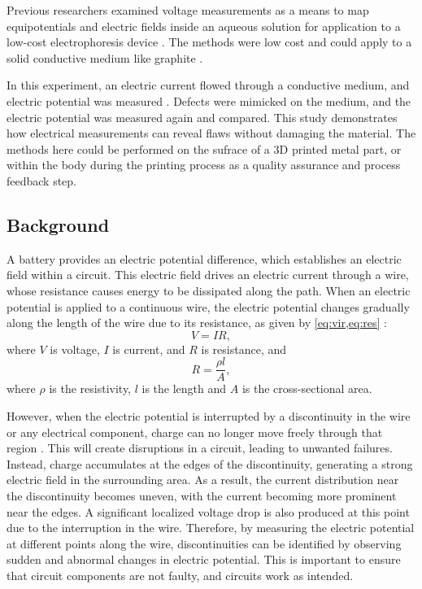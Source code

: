 \documentclass[10pt,journal,twoside]{IEEEtran} %
\begin{document}
Previous researchers examined voltage measurements as a means to map equipotentials and electric fields inside an aqueous solution for application to a low-cost electrophoresis device \cite{ayyagari:2024:computational,baru:2024:demonstrating,cohen:2024:visualizing,edwards:2024:electric,kumar:2024:mapping}. The methods were low cost and could apply to a solid conductive medium like graphite \cite{nist}. 

In this experiment, an electric current flowed through a conductive medium, and electric potential was measured \cite{griffiths:2013:introduction,kittel:2004:introduction,nave:2000:hyperphysics,tipler,barrons,openstax,knight:2017:physics}. Defects were mimicked on the medium, and the electric potential was measured again and compared. This study demonstrates how electrical measurements can reveal flaws without damaging the material. The methods here could be performed on the sufrace of a 3D printed metal part, or within the body during the printing process as a quality assurance and process feedback step. 

\subsection*{Background}

A battery provides an electric potential difference, which establishes an electric field within a circuit. This electric field drives an electric current through a wire, whose resistance causes energy to be dissipated along the path. When an electric potential is applied to a continuous wire, the electric potential changes gradually along the length of the wire due to its resistance, as given by \cref{eq:vir,eq:res} \cite{tipler,barrons,openstax,knight:2017:physics}:
\begin{equation}
V = IR,
\label{eq:vir}
\end{equation}
where $V$ is voltage, $I$ is current, and $R$ is resistance, and
\begin{equation}
R = \dfrac{\rho l}{A},
\label{eq:res}
\end{equation}
where $\rho$ is the resistivity, $l$ is the length and $A$ is the cross-sectional area. 

However, when the electric potential is interrupted by a discontinuity in the wire or any electrical component, charge can no longer move freely through that region \cite{jackson:1999:classical,griffiths:2013:introduction,kittel:2004:introduction}. This will create disruptions in a circuit, leading to unwanted failures. Instead, charge accumulates at the edges of the discontinuity, generating a strong electric field in the surrounding area. As a result, the current distribution near the discontinuity becomes uneven, with the current becoming more prominent near the edges. A significant localized voltage drop is also produced at this point due to the interruption in the wire. Therefore, by measuring the electric potential at different points along the wire, discontinuities can be identified by observing sudden and abnormal changes in electric potential. This is important to ensure that circuit components are not faulty, and circuits work as intended.
\end{document}
